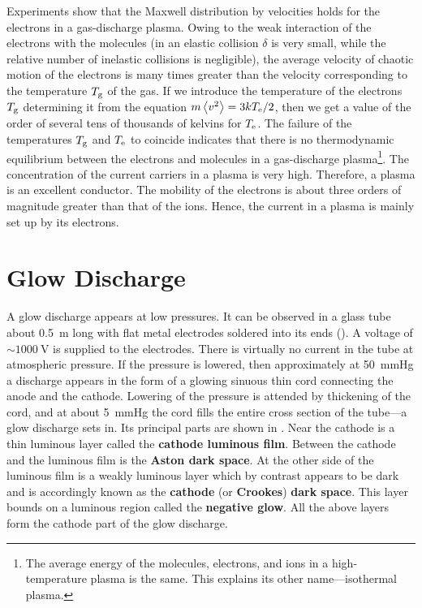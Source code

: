 Experiments show that the Maxwell distribution by velocities holds for the electrons in a gas-discharge plasma.
Owing to the weak interaction of the electrons with the molecules (in an elastic collision $\delta$ is very small, while the relative number of inelastic collisions is negligible), the average velocity of chaotic motion of the electrons is many times greater than the velocity corresponding to the temperature $T_{\text{g}}$ of the gas.
If we introduce the temperature of the electrons $T_{\text{g}}$ determining it from the equation $m\left\langle v^2 \right\rangle=3kT_{\text{e}}/2$, then we get a value of the order of several tens of thousands of kelvins for $T_{\text{e}}$.
The failure of the temperatures $T_{\text{g}}$ and $T_{\text{e}}$ to coincide indicates that there is no thermodynamic equilibrium between the electrons and molecules in a gas-discharge plasma\footnote{The average energy of the molecules, electrons, and ions in a high-temperature plasma is the same. This explains its other name---isothermal plasma.}.
The concentration of the current carriers in a plasma is very high.
Therefore, a plasma is an excellent conductor.
The mobility of the electrons is about three orders of magnitude greater than that of the ions.
Hence, the current in a plasma is mainly set up by its electrons.

\section{Glow Discharge}\label{sec:12_6}

A glow discharge appears at low pressures.
It can be observed in a glass tube about \SI{0.5}{\metre} long with flat metal electrodes soldered into its ends ().
A voltage of $\sim\SI{1000}{\volt}$ is supplied to the electrodes.
There is virtually no current in the tube at atmospheric pressure.
If the pressure is lowered, then approximately at \SI{50}{\mmHg} a discharge appears in the form of a glowing sinuous thin cord connecting the anode and the cathode.
Lowering of the pressure is attended by thickening of the cord, and at about \SI{5}{\mmHg} the cord fills the entire cross section of the tube---a glow discharge sets in.
Its principal parts are shown in .
Near the cathode is a thin luminous layer called the \textbf{cathode luminous film}.
Between the cathode and the luminous film is the \textbf{Aston dark space}.
At the other side of the luminous film is a weakly luminous layer which by contrast appears to be dark and is accordingly known as the \textbf{cathode} (or \textbf{Crookes}) \textbf{dark space}.
This layer bounds on a luminous region called the \textbf{negative glow}.
All the above layers form the cathode part of the glow discharge.

